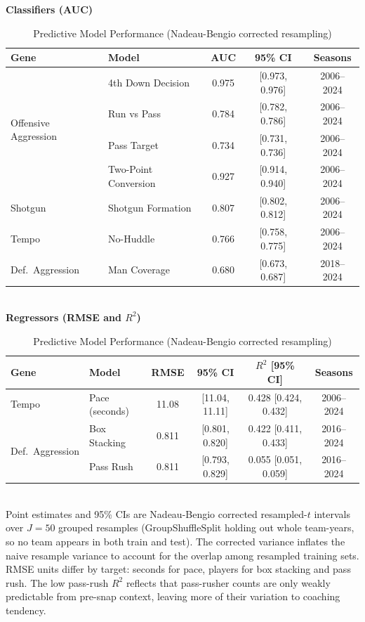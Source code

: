 \documentclass[USenglish]{article}
\theoremstyle{dgthm}
\theoremstyle{dgdef}
\begin{document}
\begin{table}[H]
\caption{Predictive Model Performance (Nadeau-Bengio corrected resampling)}
\label{tab:all_models}
\scriptsize
\textbf{Classifiers (AUC)}\\[2pt]
\begin{tabular}{llccc}
\toprule
\textbf{Gene} & \textbf{Model} & \textbf{AUC} & \textbf{95\% CI} & \textbf{Seasons} \\
\midrule
\multirow{4}{*}{Offensive Aggression} & 4th Down Decision & 0.975 & [0.973, 0.976] & 2006--2024 \\
 & Run vs Pass & 0.784 & [0.782, 0.786] & 2006--2024 \\
 & Pass Target & 0.734 & [0.731, 0.736] & 2006--2024 \\
 & Two-Point Conversion & 0.927 & [0.914, 0.940] & 2006--2024 \\
\midrule
Shotgun & Shotgun Formation & 0.807 & [0.802, 0.812] & 2006--2024 \\
Tempo & No-Huddle & 0.766 & [0.758, 0.775] & 2006--2024 \\
Def.\ Aggression & Man Coverage & 0.680 & [0.673, 0.687] & 2018--2024 \\
\bottomrule
\end{tabular}
\\[6pt]
\textbf{Regressors (RMSE and $R^2$)}\\[2pt]
\begin{tabular}{llcccc}
\toprule
\textbf{Gene} & \textbf{Model} & \textbf{RMSE} & \textbf{95\% CI} & \textbf{$R^2$ [95\% CI]} & \textbf{Seasons} \\
\midrule
Tempo & Pace (seconds) & 11.08 & [11.04, 11.11] & 0.428 [0.424, 0.432] & 2006--2024 \\
\multirow{2}{*}{Def.\ Aggression} & Box Stacking & 0.811 & [0.801, 0.820] & 0.422 [0.411, 0.433] & 2016--2024 \\
 & Pass Rush & 0.811 & [0.793, 0.829] & 0.055 [0.051, 0.059] & 2016--2024 \\
\bottomrule
\end{tabular}
\\[2pt]
{\scriptsize Point estimates and 95\% CIs are Nadeau-Bengio corrected resampled-$t$ intervals \citep{nadeau2003} over $J=50$ grouped resamples (GroupShuffleSplit holding out whole team-years, so no team appears in both train and test). The corrected variance inflates the naive resample variance to account for the overlap among resampled training sets. RMSE units differ by target: seconds for pace, players for box stacking and pass rush. The low pass-rush $R^2$ reflects that pass-rusher counts are only weakly predictable from pre-snap context, leaving more of their variation to coaching tendency.}
\end{table}
\end{document}
